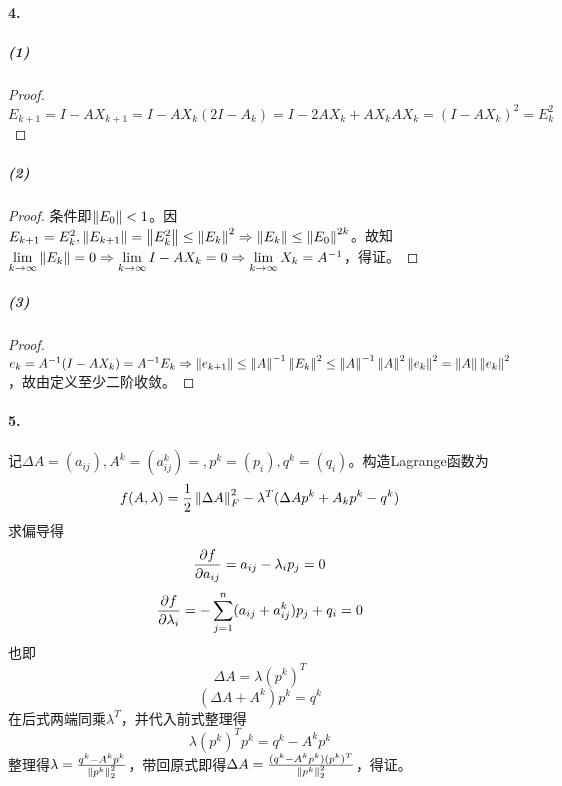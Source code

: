 \documentclass{ctexart}
\begin{document}
\paragraph{4.}
\subparagraph{(1)}
\begin{proof}
$E_{k+1}=I-AX_{k+1}=I-AX_k(2I-A_k)=I-2AX_k+AX_kAX_k=(I-AX_k)^2=E_k^2$
\end{proof}
\subparagraph{(2)}
\begin{proof}
条件即$\left\|E_0\right\|<1$。因$E_{k+1}=E_k^2, \left\|E_{k+1}\right\|=\left\|E_k^2\right\|\leq \left\|E_k\right\|^2\Rightarrow \left\|E_k\right\|\leq \left\|E_0\right\|^{2k}$。故知$\lim\limits_{k\to\infty}\left\|E_k\right\|=0\Rightarrow \lim\limits_{k\to\infty}I-AX_k=0\Rightarrow \lim\limits_{k\to\infty}X_k=A^{-1}$，得证。
\end{proof}
\subparagraph{(3)}
\begin{proof}
$e_k=A^{-1}(I-AX_k)=A^{-1}E_k\Rightarrow \left\|e_{k+1}\right\|\leq \left\|A\right\|^{-1}\left\|E_k\right\|^2\leq \left\|A\right\|^{-1}\left\|A\right\|^2\left\|e_k\right\|^2=\left\|A\right\|\left\|e_k\right\|^2$，故由定义至少二阶收敛。
\end{proof}

\paragraph{5.}
记$\Delta A=(a_{ij}),A^k=(a_{ij}^k)=,p^k=(p_i),q^k=(q_i)$。构造Lagrange函数为
\[f(A,\lambda)=\frac{1}{2}\left\|\Delta A\right\|_F^2-\lambda^T(\Delta Ap^k+A_kp^k-q^k)\]
求偏导得
\[\frac{\partial f}{\partial a_{ij}}=a_{ij}-\lambda_i p_j=0\]
\[\frac{\partial f}{\partial \lambda_i}=-\sum_{j=1}^n (a_{ij}+a^k_{ij})p_j+q_i=0\]
也即
\[\Delta A=\lambda (p^k)^T\]
\[(\Delta A+A^k)p^k=q^k\]
在后式两端同乘$\lambda^T$，并代入前式整理得
\[\lambda(p^k)^Tp^k=q^k-A^kp^k\]
整理得$\lambda=\frac{q^k-A^kp^k}{\left\|p^k\right\|_2^2}$，带回原式即得$\Delta A=\frac{(q^k-A^kp^k)(p^k)^T}{\left\|p^k\right\|_2^2}$，得证。
\end{document}
